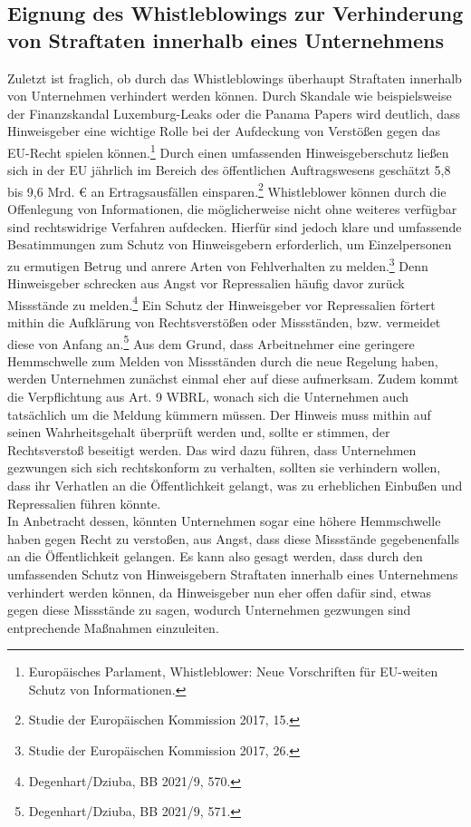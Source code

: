 \subsection{Eignung des Whistleblowings zur Verhinderung von Straftaten innerhalb eines Unternehmens}

Zuletzt ist fraglich, ob durch das Whistleblowings überhaupt Straftaten innerhalb von Unternehmen verhindert werden können.
Durch Skandale wie beispielsweise der Finanzskandal Luxemburg-Leaks oder die Panama Papers wird deutlich, dass Hinweisgeber eine wichtige Rolle bei der Aufdeckung von Verstößen gegen das EU-Recht spielen können.\footnote{Europäisches Parlament, Whistleblower: Neue Vorschriften für EU-weiten Schutz von Informationen.}
Durch einen umfassenden Hinweisgeberschutz ließen sich in der EU jährlich im Bereich des öffentlichen Auftragswesens geschätzt 5,8 bis 9,6 Mrd. € an Ertragsausfällen einsparen.\footnote{Studie der Europäischen Kommission 2017, 15.}
Whistleblower können durch die Offenlegung von Informationen, die möglicherweise nicht ohne weiteres verfügbar sind rechtswidrige Verfahren aufdecken.
Hierfür sind jedoch klare und umfassende Besatimmungen zum Schutz von Hinweisgebern erforderlich, um Einzelpersonen zu ermutigen Betrug und anrere Arten von Fehlverhalten zu melden.\footnote{Studie der Europäischen Kommission 2017, 26.}
Denn Hinweisgeber schrecken aus Angst vor Repressalien häufig davor zurück Missstände zu melden.\footnote{Degenhart/Dziuba, BB 2021/9, 570.}
Ein Schutz der Hinweisgeber vor Repressalien förtert mithin die Aufklärung von Rechtsverstößen oder Missständen, bzw. vermeidet diese von Anfang an.\footnote{Degenhart/Dziuba, BB 2021/9, 571.}
Aus dem Grund, dass Arbeitnehmer eine geringere Hemmschwelle zum Melden von Missständen durch die neue Regelung haben, werden Unternehmen zunächst einmal eher auf diese aufmerksam. 
Zudem kommt die Verpflichtung aus Art. 9 WBRL, wonach sich die Unternehmen auch tatsächlich um die Meldung kümmern müssen. 
Der Hinweis muss mithin auf seinen Wahrheitsgehalt überprüft werden und, sollte er stimmen, der Rechtsverstoß beseitigt werden.
Das wird dazu führen, dass Unternehmen gezwungen sich sich rechtskonform zu verhalten, sollten sie verhindern wollen, dass ihr Verhatlen an die Öffentlichkeit gelangt, was zu erheblichen Einbußen und Repressalien führen könnte.\\
In Anbetracht dessen, könnten Unternehmen sogar eine höhere Hemmschwelle haben gegen Recht zu verstoßen, aus Angst, dass diese Missstände gegebenenfalls an die Öffentlichkeit gelangen.
Es kann also gesagt werden, dass durch den umfassenden Schutz von Hinweisgebern Straftaten innerhalb eines Unternehmens verhindert werden können, da Hinweisgeber nun eher offen dafür sind, etwas gegen diese Missstände zu sagen, wodurch Unternehmen gezwungen sind entprechende Maßnahmen einzuleiten.